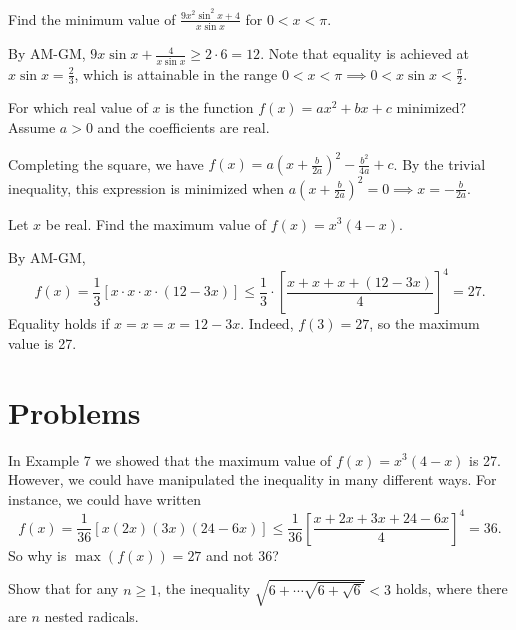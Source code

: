 \documentclass{article}
\begin{document}
\begin{exam}[AIME 1983/9]
Find the minimum value of $\frac{9x^2\sin^2 x + 4}{x\sin x}$ for $0 < x < \pi$.
\end{exam}
\begin{sol}
By AM-GM, $9x\sin x+\frac{4}{x\sin x}\ge 2\cdot 6=12.$ Note that equality is achieved at $x\sin x=\frac23$, which is attainable in the range $0<x<\pi\implies 0<x\sin x<\frac{\pi}2$. 
\end{sol}

\begin{exam}
For which real value of $x$ is the function $f(x)=ax^2+bx+c$ minimized? Assume $a>0$ and the coefficients are real. 
\end{exam}
\begin{sol}
Completing the square, we have $f(x)=a\left(x+\frac{b}{2a}\right)^2-\frac{b^2}{4a}+c$. By the trivial inequality, this expression is minimized when $a\left(x+\frac{b}{2a}\right)^2=0\implies x=-\frac{b}{2a}$. 
\end{sol}

\begin{exam}[WOOT]
{Let $x$ be real. Find the maximum value of $f(x)=x^3(4-x)$. }
\end{exam}
\begin{sol}
By AM-GM, \[f(x)=\frac13[x\cdot x\cdot x\cdot (12-3x)]\le \frac13\cdot \left[\frac{x+x+x+(12-3x)}4\right]^4=27.\]Equality holds if $x=x=x=12-3x$. Indeed, $f(3)=27$, so the maximum value is 27. 
\end{sol}
\pagebreak

\section{Problems}

\begin{req}[WOOT]{2}
In Example 7 we showed that the maximum value of $f(x)=x^3(4-x)$ is 27. However, we could have manipulated the inequality in many different ways. For instance, we could have written \[f(x)=\frac 1{36}[x(2x)(3x)(24-6x)]\le\frac1{36}\left[\frac{x+2x+3x+24-6x}4\right]^4=36.\] So why is $\max(f(x))=27$ and not 36?
\end{req} 

\begin{prob}[]{2}
Show that for any $n\ge1$, the inequality $\sqrt{6+\cdots \sqrt{6+\sqrt{6}}}<3$ holds, where there are $n$ nested radicals. 
\end{prob} 
\end{document}
